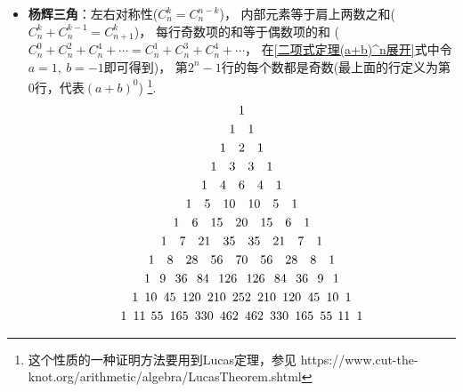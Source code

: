 \begin{itemize}[leftmargin=\inteval{\myitemleftmargin}pt,itemsep=
   \inteval{\myitemitempsep}pt,topsep=\inteval{\myitemtopsep}pt]
\item \textbf{杨辉三角}：左右对称性($C_n^k=C_n^{n-k}$)，
内部元素等于肩上两数之和($C_n^k+C_n^{k-1}=C_{n+1}^k$)，
每行奇数项的和等于偶数项的和
($C_n^0+C_n^2+C_n^4+\cdots=C_n^1+C_n^3+C_n^4+\cdots$，
在\eqref{二项式定理(a+b)^n展开}式中令$a=1,\ b=-1$即可得到)，
第$2^n-1$行的每个数都是奇数(最上面的行定义为第0行，代表$(a+b)^0$)
\footnote{这个性质的一种证明方法要用到Lucas定理，参见
https://www.cut-the-knot.org/arithmetic/algebra/LucasTheorem.shtml}.
{ \small
  \linespread{1.2}\selectfont
\begin{gather*}
    1 \\
    1\q 1 \\
    1\q 2 \q 1 \\   
    1\q 3 \q 3 \q 1 \\
    1\q 4 \q 6 \q 4 \q 1 \\
    1\q 5 \q 10 \q 10 \q 5 \q 1 \\
    1\q 6 \q 15 \q 20 \q 15 \q 6 \q 1  \\ 
    1\q 7 \q 21 \q 35 \q 35 \q 21 \q 7 \q 1  \\ 
    1\q 8 \q 28 \q 56 \q 70 \q 56 \q 28 \q 8 \q 1 \\
    1\hspace{2.6mm} 9 \hspace{2.6mm} 36 \hspace{2.6mm} 84 \hspace{2.6mm} 126 \hspace{2.6mm} 126 \hspace{2.6mm} 84 \hspace{2.6mm} 36 \hspace{2.6mm} 9 \hspace{2.6mm} 1  \\ 
1\hspace{1.8mm} 10 \hspace{1.8mm} 45 \hspace{1.8mm} 120 \hspace{1.8mm} 210 \hspace{1.8mm} 252 \hspace{1.8mm} 210 \hspace{1.8mm} 120 \hspace{1.8mm} 45 \hspace{1.8mm} 10 \hspace{1.8mm} 1  \\ 
1\hspace{1.8mm} 11 \hspace{1.5mm} 55 \hspace{1.8mm} 165 \hspace{1.8mm} 330 \hspace{1.8mm} 462 \hspace{1.8mm} 462 \hspace{1.8mm} 330 \hspace{1.8mm} 165 \hspace{1.8mm} 55 \hspace{1.5mm} 11 \hspace{1.8mm} 1  

\end{gather*}}
\end{itemize}
